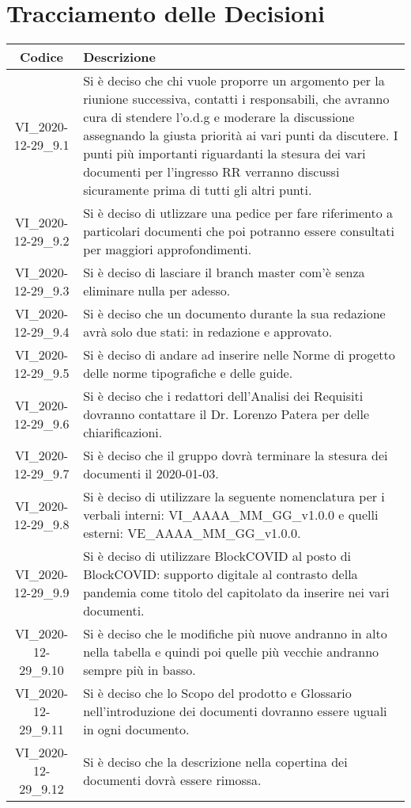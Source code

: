 \section*{Tracciamento delle Decisioni}

\begin{center}
	\begin{longtable}{|c|p{13cm}|}
	\hline
	\rowcolor{lighter-grayer}
	\textbf{Codice} & \textbf{Descrizione} \\
	\hline
	\endfirsthead

	\hline
	VI\_2020-12-29\_9.1 &  Si è deciso che chi vuole proporre un argomento per la riunione successiva, contatti i responsabili, che avranno cura di stendere l'o.d.g e moderare la discussione assegnando la giusta priorità ai vari punti da discutere.
	I punti più importanti riguardanti la stesura dei vari documenti per l'ingresso RR verranno discussi sicuramente prima di tutti gli altri punti.\\
	VI\_2020-12-29\_9.2 & Si è deciso di utlizzare una \ped{D} pedice per fare riferimento a particolari documenti che poi potranno essere consultati per maggiori approfondimenti. \\
	VI\_2020-12-29\_9.3 & Si è deciso di lasciare il branch master com'è senza eliminare nulla per adesso. \\
	VI\_2020-12-29\_9.4 & Si è deciso che un documento durante la sua redazione avrà solo due stati: in redazione e approvato. \\
	VI\_2020-12-29\_9.5 & Si è deciso di andare ad inserire nelle Norme di progetto\ped{D} delle norme tipografiche e delle guide. \\
	VI\_2020-12-29\_9.6 & Si è deciso che i redattori dell'Analisi dei Requisiti\ped{D} dovranno contattare il Dr. Lorenzo Patera per delle chiarificazioni. \\
	VI\_2020-12-29\_9.7 & Si è deciso che il gruppo dovrà terminare la stesura dei documenti il 2020-01-03. \\
	VI\_2020-12-29\_9.8 & Si è deciso di utilizzare la seguente nomenclatura per i verbali interni: VI\_AAAA\_MM\_GG\_v1.0.0 e quelli esterni:  VE\_AAAA\_MM\_GG\_v1.0.0. \\
	VI\_2020-12-29\_9.9 & Si è deciso di utilizzare BlockCOVID al posto di BlockCOVID: supporto digitale al contrasto della pandemia come titolo del capitolato da inserire nei vari documenti. \\
	VI\_2020-12-29\_9.10 & Si è deciso che le modifiche più nuove andranno in alto nella tabella e quindi poi quelle più vecchie andranno sempre più in basso.\\
	VI\_2020-12-29\_9.11 & Si è deciso che lo Scopo del prodotto e Glossario nell'introduzione dei documenti dovranno essere uguali in ogni documento. \\
	VI\_2020-12-29\_9.12 & Si è deciso che la descrizione nella copertina dei documenti dovrà essere rimossa.\\
	\hline
	\end{longtable}
\end{center}

